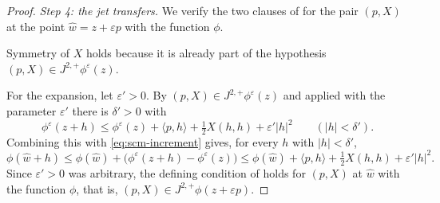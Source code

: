 \begin{proof}
\emph{Step 4: the jet transfers.}
We verify the two clauses of  for the pair $(p,X)$ at the
point $\hat w=z+\varepsilon p$ with the function $\phi$.

Symmetry of $X$ holds because it is already part of the hypothesis
$(p,X)\in J^{2,+}\phi^\varepsilon(z)$.

For the expansion, let $\varepsilon'>0$. By
$(p,X)\in J^{2,+}\phi^\varepsilon(z)$ and  applied with the
parameter $\varepsilon'$ there is $\delta'>0$ with
\[
  \phi^\varepsilon(z+h)\le\phi^\varepsilon(z)+\langle p,h\rangle
     +\tfrac12X(h,h)+\varepsilon'|h|^2
  \qquad(|h|<\delta').
\]
Combining this with \eqref{eq:scm-increment} gives, for every $h$ with
$|h|<\delta'$,
\[
  \phi(\hat w+h)\le\phi(\hat w)+\bigl(\phi^\varepsilon(z+h)-\phi^\varepsilon(z)\bigr)
   \le\phi(\hat w)+\langle p,h\rangle+\tfrac12X(h,h)+\varepsilon'|h|^2 .
\]
Since $\varepsilon'>0$ was arbitrary, the defining condition of
 holds for $(p,X)$ at $\hat w$ with the function $\phi$, that
is, $(p,X)\in J^{2,+}\phi(z+\varepsilon p)$.
\end{proof}

